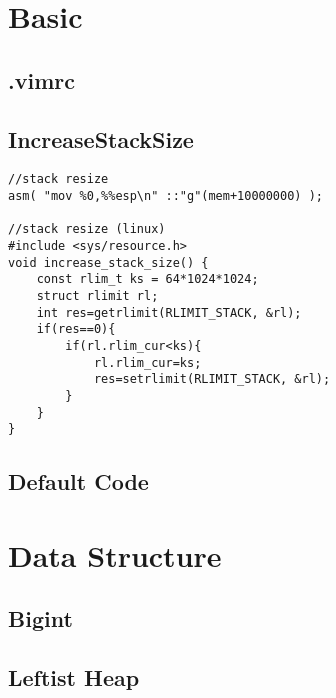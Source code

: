 \documentclass[10pt,twocolumn,oneside]{article}
\begin{document}
\pagestyle{fancy}
\fancyfoot{}
\fancyhead[R]{\thepage}
\renewcommand{\headrulewidth}{0.4pt}
\renewcommand{\contentsname}{Contents} 

\scriptsize
\tableofcontents
\section{Basic}
\subsection{.vimrc}




\newpage

\subsection{IncreaseStackSize}
\begin{lstlisting}
//stack resize
asm( "mov %0,%%esp\n" ::"g"(mem+10000000) );

//stack resize (linux)
#include <sys/resource.h>
void increase_stack_size() {
	const rlim_t ks = 64*1024*1024;
	struct rlimit rl;
	int res=getrlimit(RLIMIT_STACK, &rl);
	if(res==0){
		if(rl.rlim_cur<ks){
			rl.rlim_cur=ks;
			res=setrlimit(RLIMIT_STACK, &rl);
		}
	}
}
\end{lstlisting}

\subsection{Default Code}

\newpage

\section{Data Structure}
\subsection{Bigint}


\newpage
\subsection{Leftist Heap}

\end{document}
